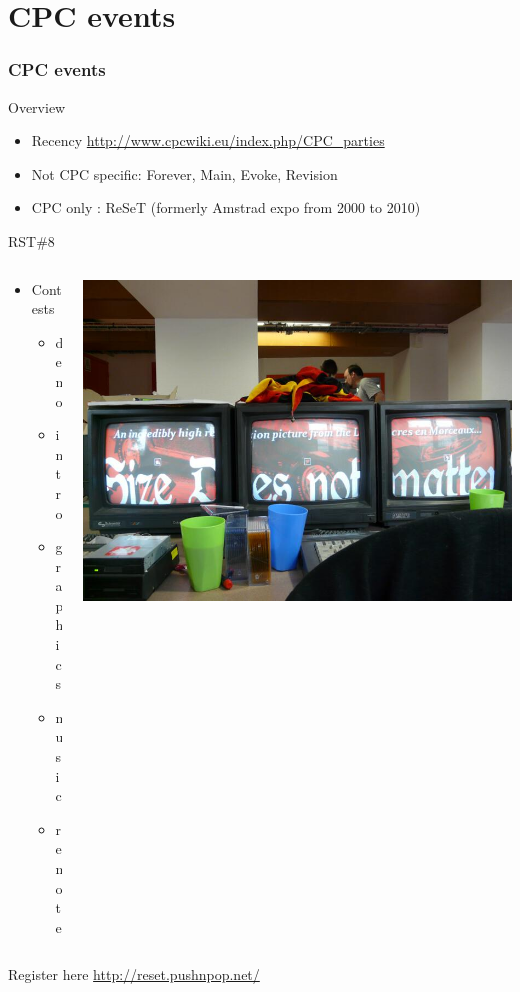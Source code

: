 \documentclass{beamer}
\begin{document}
  \section{CPC events} %
    \label{sec_CPC events}
    \begin{frame}
      \frametitle{CPC events}

      \begin{block}{Overview}

	\begin{itemize}
	  \item Recency \url{http://www.cpcwiki.eu/index.php/CPC_parties}
	  \item Not CPC specific: Forever, Main, Evoke, Revision
	  \item CPC only : ReSeT (formerly Amstrad expo from 2000 to 2010)
	\end{itemize}
      \end{block}

      \begin{block}{RST\#8}




	\begin{columns}
	  \begin{column}{.5\linewidth}
	    \begin{itemize}
	      \item Contests
	      \begin{itemize}
		\item demo
		\item intro
		\item graphics
		\item music
		\item remote
	      \end{itemize}
	    \end{itemize}
	  \end{column}
	  \begin{column}{.5\linewidth}
	    \includegraphics[width=.8\linewidth]{imgs/P1030704.jpg}
	  \end{column}
	\end{columns}

	\large
	\begin{center}
	  Register here \url{http://reset.pushnpop.net/}
	\end{center}
      \end{block}
    \end{frame}


    
\end{document}
